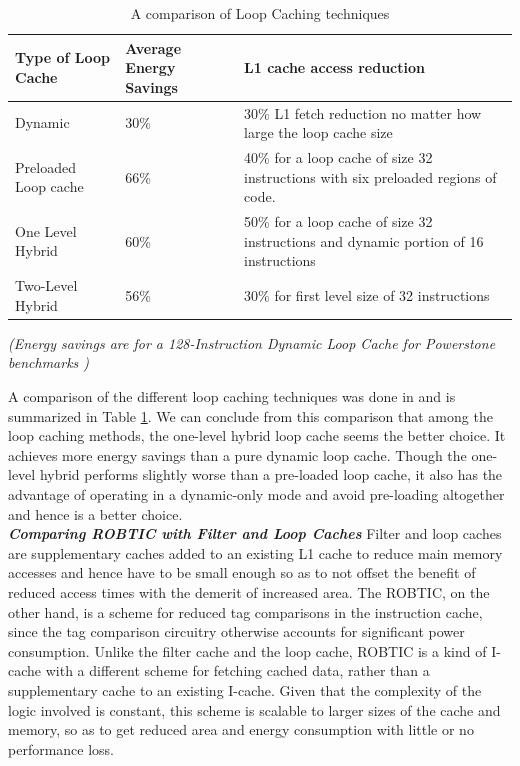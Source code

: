 \documentclass[conference]{IEEEtran}
\begin{document}
\begin{table}
\centering
	\caption{A comparison of Loop Caching techniques}
	\label{table:loop_cache}
	\begin{tabular}{ | p{1.5cm} | p{1.3cm} |p{2.5cm} |}
			\hline
		\textbf{Type of Loop Cache} & \textbf{Average Energy Savings}	&  	\textbf{L1 cache access reduction}  \\ \hline
			Dynamic & 30\%  & 30\% L1 fetch reduction no matter how large the loop cache size \\ \hline
		Preloaded Loop cache &	 66\%  &40\% for
a loop cache of size 32 instructions with six preloaded regions of code. \\ \hline
		One Level Hybrid &	60\%  & 50\% for
a loop cache of size 32 instructions and dynamic portion of 16 instructions		\\ \hline
Two-Level Hybrid & 56\% & 30\% for
first level size of 32 instructions 		\\ \hline
		\end{tabular}
		\smallskip
		
		\textit{(Energy savings are for a 128-Instruction Dynamic Loop Cache for Powerstone benchmarks \cite{1})}
		
	\end{table}
A comparison of the different loop caching techniques was done in \cite{1} and is summarized in Table \ref{table:loop_cache}. We can conclude from this comparison that among the loop caching methods, the one-level hybrid loop cache seems the better choice. It achieves more energy savings than a pure dynamic loop cache. Though the one-level hybrid performs slightly worse than a pre-loaded loop cache, it also has the advantage of operating in a dynamic-only mode and avoid pre-loading altogether and hence is a better choice.\newline\\
\textit{\textbf{Comparing ROBTIC with Filter and Loop Caches}} \newline
Filter and loop caches are supplementary caches added to an existing L1 cache to reduce main memory accesses and hence have to be small enough so as to not offset the benefit of reduced access times with the demerit of increased area. The ROBTIC, on the other hand, is a scheme for reduced tag comparisons in the instruction cache, since the tag comparison circuitry otherwise accounts for significant power consumption. Unlike the filter cache and the loop cache, ROBTIC is a kind of I-cache with a different scheme for fetching cached data, rather than a supplementary cache to an existing I-cache. Given that the complexity of the logic involved is constant, this scheme is scalable to larger sizes of the cache and memory, so as to get reduced area and energy consumption with little or no performance loss.
\end{document}
